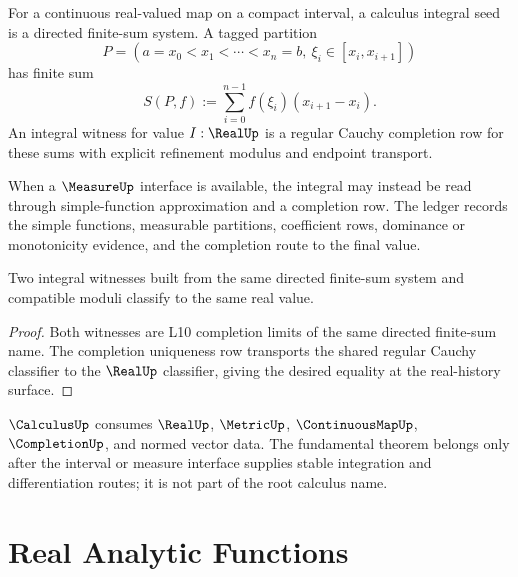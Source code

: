 \begin{definition}
\label{def:analysis-spine-finite-sum-integral}
For a continuous real-valued map on a compact interval, a calculus integral
seed is a directed finite-sum system.  A tagged partition
$$
P=(a=x_0<x_1<\cdots <x_n=b,\ \xi_i\in[x_i,x_{i+1}])
$$
has finite sum
$$
S(P,f):=\sum_{i=0}^{n-1}f(\xi_i)(x_{i+1}-x_i).
$$
An integral witness for value $I:\RealUp$ is a regular Cauchy completion row
for these sums with explicit refinement modulus and endpoint transport.
\end{definition}

\begin{definition}
\label{def:analysis-spine-measure-integral}
When a $\MeasureUp$ interface is available, the integral may instead be read
through simple-function approximation and a completion row.  The ledger
records the simple functions, measurable partitions, coefficient rows,
dominance or monotonicity evidence, and the completion route to the final
value.
\end{definition}

\begin{theorem}
\label{thm:analysis-spine-integral-uniqueness}
Two integral witnesses built from the same directed finite-sum system and
compatible moduli classify to the same real value.
\end{theorem}

\begin{proof}
Both witnesses are L10 completion limits of the same directed finite-sum
name.  The completion uniqueness row transports the shared regular Cauchy
classifier to the $\RealUp$ classifier, giving the desired equality at the
real-history surface.
\end{proof}

\begin{principle}
\label{prin:analysis-spine-calculus-boundary}
$\CalculusUp$ consumes $\RealUp$, $\MetricUp$, $\ContinuousMapUp$,
$\CompletionUp$, and normed vector data.  The fundamental theorem belongs
only after the interval or measure interface supplies stable integration and
differentiation routes; it is not part of the root calculus name.
\end{principle}

\section{Real Analytic Functions}
\label{sec:analysis-spine-real-analytic}


